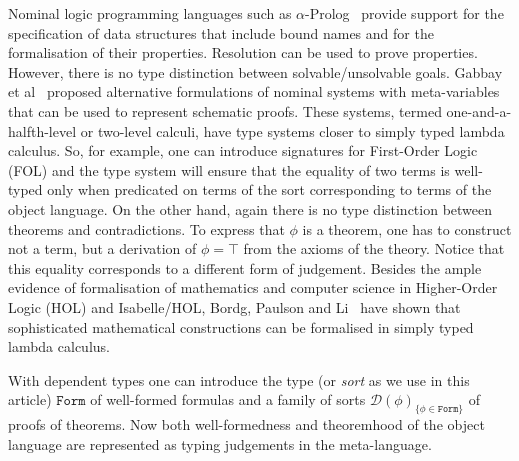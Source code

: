\documentclass[copyright,creativecommons]{eptcs}
\newcounter{s}
\newcommand{\form}{\texttt{Form}}
\newcommand{\prf}{\ensuremath{\mathcal{D}}}
\begin{document}
Nominal logic programming languages such as $\alpha$-Prolog~\cite{CheneyJ:alpp} provide support for the specification of data structures that include bound names and for the formalisation of their properties. Resolution can be used to prove properties. However, there is no type distinction between solvable/unsolvable goals.
Gabbay et al~\cite{gabbay:capasn-jv,gabbay:oneaah-jv,gabbay:curhid} proposed alternative formulations of nominal systems with meta-variables that can be used to represent schematic proofs.
These systems, termed one-and-a-halfth-level or two-level calculi, have type systems closer to simply typed lambda calculus.
So, for example, one can introduce signatures for First-Order Logic (FOL) and the type system will ensure that the equality of two terms is well-typed only when predicated on terms of the sort corresponding to terms of the object language. On the other hand, again there is no type distinction between theorems and contradictions. 
To express that $\phi$ is a theorem, one has to construct not a term, but a derivation of $\phi = \top$ from the axioms of the theory. Notice that this equality corresponds to a different form of judgement. Besides the ample evidence of formalisation of mathematics and computer science in Higher-Order Logic (HOL) and Isabelle/HOL, Bordg, Paulson and Li~\cite{DBLP:journals/em/BordgPL22} have shown that %
sophisticated mathematical constructions can be formalised in simply typed lambda calculus.

With dependent types one can introduce the type (or \emph{sort} as we use in this article) $\form$ of well-formed formulas and a family of sorts $\prf{(\phi)}_{\{\phi \in \form\}}$ of proofs of theorems. Now both well-formedness and theoremhood of the object language are represented  as typing judgements in the meta-language.
\end{document}
